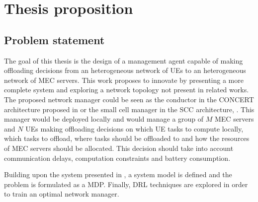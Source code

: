 \chapter{Thesis proposition}

\section{Problem statement}
\noindent The goal of this thesis is the design of a management agent capable of making offloading decisions from an heterogeneous network of \acrshort{UE}s to an heterogeneous network of \acrshort{MEC} servers. This work proposes to innovate by presenting a more complete system and exploring a network topology not present in related works. The proposed network manager could be seen as the conductor in the CONCERT architecture proposed in \cite{CONCERT} or the small cell manager in the \acrshort{SCC} architecture, \cite{SESAM}. This manager would be deployed locally and would manage a group of $M$ \acrshort{MEC} servers and $N$ \acrshort{UE}s making offloading decisions on which \acrshort{UE} tasks to compute locally, which tasks to offload, where tasks should be offloaded to and how the resources of \acrshort{MEC} servers should be allocated. This decision should take into account communication delays, computation constraints and battery consumption.

Building upon the system presented in \cite{NUE1mec}, a system model is defined and the problem is formulated as a \acrshort{MDP}. Finally, \acrshort{DRL} techniques are explored in order to train an optimal network manager.

